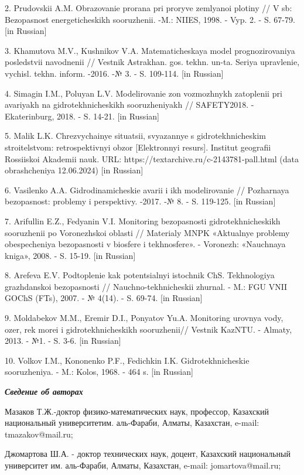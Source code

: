 2. Prudovskii A.M. Obrazovanie prorana pri proryve zemlyanoi plotiny //
V sb: Bezopasnost\textquotesingle{} energeticheskikh sooruzhenii. -M.:
NIIES, 1998. - Vyp. 2. - S. 67-79. {[}in Russian{]}

3. Khamutova M.V., Kushnikov V.A. Matematicheskaya
model\textquotesingle{} prognozirovaniya posledstvii navodnenii //
Vestnik Astrakhan. gos. tekhn. un-ta. Seriya upravlenie, vychisl. tekhn.
inform. -2016. -№ 3. - S. 109-114. {[}in Russian{]}

4. Simagin I.M., Poluyan L.V. Modelirovanie zon vozmozhnykh zatoplenii
pri avariyakh na gidrotekhnicheskikh sooruzheniyakh // SAFETY2018. -
Ekaterinburg, 2018. - S. 14-21. {[}in Russian{]}

5. Malik L.K. Chrezvychainye situatsii, svyazannye s gidrotekhnicheskim
stroitel\textquotesingle stvom: retrospektivnyi obzor {[}Elektronnyi
resurs{]}. Institut geografii Rossiiskoi Akademii nauk. URL:
https://textarchive.ru/c-2143781-pall.html (data obrashcheniya
12.06.2024) {[}in Russian{]}

6. Vasilenko A.A. Gidrodinamicheskie avarii i ikh modelirovanie //
Pozharnaya bezopasnost\textquotesingle: problemy i perspektivy. -2017.
-№ 8. - S. 119-125. {[}in Russian{]}

7. Arifullin E.Z., Fedyanin V.I. Monitoring bezopasnosti
gidrotekhnicheskikh sooruzhenii po Voronezhskoi oblasti // Materialy
MNPK «Aktual\textquotesingle nye problemy obespecheniya bezopasnosti v
biosfere i tekhnosfere». - Voronezh: «Nauchnaya kniga», 2008. - S.
15-19. {[}in Russian{]}

8. Aref\textquotesingle eva E.V. Podtoplenie kak
potentsial\textquotesingle nyi istochnik ChS. Tekhnologiya grazhdanskoi
bezopasnosti // Nauchno-tekhnicheskii zhurnal. - M.: FGU VNII GOChS
(FTs), 2007. - № 4(14). - S. 69-74. {[}in Russian{]}

9. Moldabekov M.M., Eremir D.I., Ponyatov Yu.A. Monitoring urovnya vody,
ozer, rek morei i gidrotekhnicheskikh sooruzhenii// Vestnik KazNTU. -
Almaty, 2013. - №1. - S. 3-6. {[}in Russian{]}

10. Volkov I.M., Kononenko P.F., Fedichkin I.K. Gidrotekhnicheskie
sooruzheniya. - M.: Kolos, 1968. - 464 s. {[}in Russian{]}

\emph{\textbf{Сведение об авторах}}

Мазаков Т.Ж.-доктор физико-математических наук, профессор, Казахский
национальный университетим. аль-Фараби, Алматы, Казахстан, e-mail:
tmazakov@mail.ru;

Джомартова Ш.А. - доктор технических наук, доцент, Казахский
национальный университет им. аль-Фараби, Алматы, Казахстан, e-mail:
jomartova@mail.ru;

